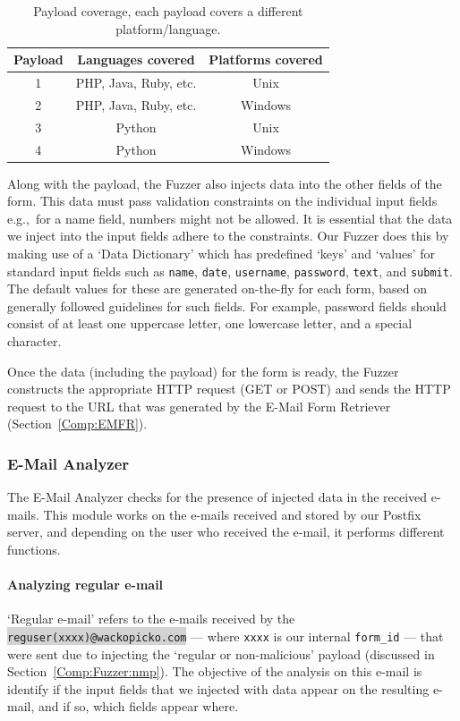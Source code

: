 \begin{table}[!htbp]
	\centering
	\begin{tabular}{|c|c|c|}
		\hline
		\multicolumn{1}{|c|}{\textbf{Payload}} & \multicolumn{1}{c}{\textbf{Languages covered}} & \multicolumn{1}{|c|}{\textbf{Platforms covered}}\\
		\hline
		1 & PHP, Java, Ruby, etc. & Unix\\
		\hline
		2 & PHP, Java, Ruby, etc. & Windows\\
		\hline
		3 & Python & Unix\\
		\hline
		4 & Python & Windows\\
		\hline
	\end{tabular}
	\caption[]{Payload coverage, each payload covers a different platform/language.}
	\label{tab:payloadcov}
\end{table}
Along with the payload, the Fuzzer also injects data into the other fields of the form. This data must pass validation constraints on the individual input fields e.g.,\ for a name field, numbers might not be allowed. It is essential that the data we inject into the input fields adhere to the constraints. Our Fuzzer does this by making use of a `Data Dictionary' which has predefined `keys' and `values' for standard input fields such as \texttt{name}, \texttt{date}, \texttt{username}, \texttt{password}, \texttt{text}, and \texttt{submit}. The default values for these are generated on-the-fly for each form, based on generally followed guidelines for such fields. For example, password fields should consist of at least one uppercase letter, one lowercase letter, and a special character.

Once the data (including the payload) for the form is ready, the Fuzzer constructs the appropriate HTTP request (GET or POST) and sends the HTTP request to the URL that was generated by the E-Mail Form Retriever (Section~\ref{Comp:EMFR}). 


\subsubsection{E-Mail Analyzer}
\label{Comp:EMA}
The E-Mail Analyzer checks for the presence of injected data in the received e-mails. This module works on the e-mails received and stored by our Postfix server, and depending on the user who received the e-mail, it performs different functions.
\paragraph{Analyzing regular e-mail}
`Regular e-mail' refers to the e-mails received by the \colorbox{lightgray}{\lstinline{reguser(xxxx)@wackopicko.com}} --- where \texttt{xxxx} is our internal \texttt{form\_id} --- that were sent due to injecting the `regular or non-malicious' payload (discussed in Section~\ref{Comp:Fuzzer:nmp}). The objective of the analysis on this e-mail is identify if the input fields that we injected with data appear on the resulting e-mail, and if so, which fields appear where.

